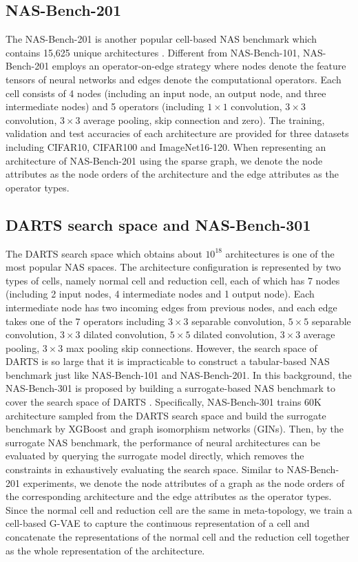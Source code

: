 \documentclass[10pt,twocolumn,letterpaper]{article}
\begin{document}
\subsection{NAS-Bench-201}
The NAS-Bench-201 is another popular cell-based NAS benchmark which contains 15,625 unique architectures \cite{DBLP:conf/iclr/Dong020}. Different from NAS-Bench-101, NAS-Bench-201 employs an operator-on-edge strategy where nodes denote the feature tensors of neural networks and edges denote the computational operators. Each cell consists of 4 nodes (including an input node, an output node, and three intermediate nodes) and 5 operators (including $1\times1$ convolution, $3\times3$ convolution, $3\times3$ average pooling, skip connection and zero). The training, validation and test accuracies of each architecture are provided for three datasets including CIFAR10, CIFAR100 and ImageNet16-120. When representing an architecture of NAS-Bench-201 using the sparse graph, we denote the node attributes as the node orders of the architecture and the edge attributes as the operator types. 
\subsection{DARTS search space and NAS-Bench-301}
The DARTS search space \cite{liu2018darts}  which obtains about $10^{18}$ architectures is one of the most popular NAS spaces. The architecture configuration is represented by two types of cells, namely normal cell and reduction cell, each of which has 7 nodes (including 2 input nodes, 4 intermediate nodes and 1 output node). Each intermediate node has two incoming edges from previous nodes, and each edge takes one of the 7 operators including $3\times3$ separable convolution, $5\times5$ separable convolution, $3\times3$ dilated convolution, $5\times5$ dilated convolution, $3\times3$ average pooling, $3\times3$ max pooling skip connections. However, the search space of DARTS is so large that it is impracticable to construct a tabular-based NAS benchmark just like NAS-Bench-101 and NAS-Bench-201. In this background, the NAS-Bench-301 is proposed by building a surrogate-based NAS benchmark to cover the search space of DARTS \cite{siems2020bench}. Specifically, NAS-Bench-301 trains 60K architecture sampled from the DARTS search space and build the surrogate benchmark by XGBoost and graph isomorphism networks (GINs). Then, by the surrogate NAS benchmark, the performance of neural architectures can be evaluated by querying the surrogate model directly, which removes the constraints in exhaustively evaluating the search space. Similar to NAS-Bench-201 experiments, we denote the node attributes of a graph as the node orders of the corresponding architecture and the edge attributes as the operator types. Since the normal cell and reduction cell are the same in meta-topology, we train a cell-based G-VAE to capture the continuous representation of a cell and concatenate the representations of the normal cell and the reduction cell together as the whole representation of the architecture.
\end{document}
